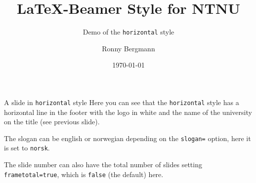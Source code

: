 \documentclass[aspectratio=169]{beamer}
\title{\LaTeX{}-Beamer Style for NTNU}
\subtitle{Demo of the  \texttt{horizontal} style}
\author{Ronny Bergmann}
\date{\today}
\begin{document}
	\maketitle
    \begin{frame}[fragile]{A slide in \texttt{horizontal} style}
        Here you can see that the \texttt{horizontal} style has a horizontal line in the footer with the logo in white and the name of the university on the title (see previous slide).

        The slogan can be english or norwegian depending on the \lstinline!slogan=! option, here it is set to \lstinline!norsk!.

        The slide number can also have the total number of slides setting \lstinline!frametotal=true!, which is \lstinline!false! (the default) here.
    \end{frame}
\end{document}
